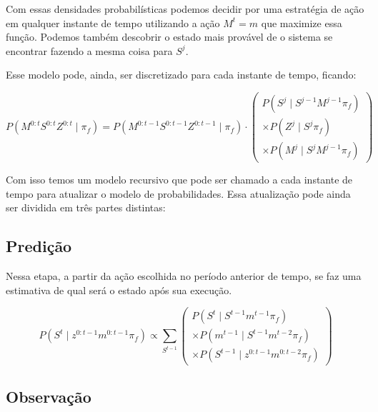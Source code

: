Com essas densidades probabilísticas podemos decidir por uma estratégia de ação em qualquer instante de tempo utilizando a ação $ M^t = m $ que maximize essa função. Podemos também descobrir o estado mais provável de o sistema se encontrar fazendo a mesma coisa para $ S^j $.

Esse modelo pode, ainda, ser discretizado para cada instante de tempo, ficando:

\begin{equation}
        P ( M^{0: t} S^{0: t} Z^{0: t} \mid \pi_f ) = P ( M^{0: t-1} S^{0: t-1} Z^{0: t-1} \mid \pi_f ) \cdot 
        \left(
            \begin{array}{l}
                P( S^j \mid S^{j -1} M^{j -1} \pi_f ) \\
                \times P( Z^j \mid S^j \pi_f ) \\
                \times P( M^j \mid S^j M^{j -1} \pi_f )
            \end{array}
        \right)
\end{equation}

Com isso temos um modelo recursivo que pode ser chamado a cada instante de tempo para atualizar o modelo de probabilidades. Essa atualização pode ainda ser dividida em três partes distintas:

\subsection{Predição}

Nessa etapa, a partir da ação escolhida no período anterior de tempo, se faz uma estimativa de qual será o estado após sua execução.

\begin{equation}
    P \left( S^t \mid z^{0: t-1} m^{0: t-1} \pi_f \right) \propto \sum\limits_{S^{t-1}}
        \left(
            \begin{array}{l}
                P \left( S^t \mid S^{t-1} m^{t-1} \pi_f \right) \\
                \times P \left( m^{t-1} \mid S^{t-1} m^{t-2} \pi_f \right)\\
                \times P \left( S^{t-1} \mid z^{0: t-1} m^{0: t-2} \pi_f \right)
            \end{array}
        \right)
\end{equation}


\subsection{Observação}

